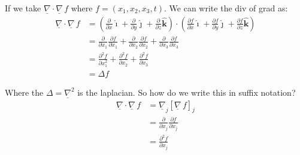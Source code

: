 \documentclass{article}
\newcommand{\veci}{\bm{\hat{\imath}}}
\newcommand{\vecj}{\bm{\hat{\jmath}}}
\newcommand{\veck}{\bm{\hat{k}}}
\newcommand{\nab}{\underline{\nabla}}
\newcommand{\grad}{{\nab}\, f}
\newcommand{\pd}[2]{\frac{\partial #1}{\partial #2}}
\renewcommand{\div}[1]{\nab \cdot #1}
\begin{document}
If we take $\nab \cdot \grad$ where $f = (x_1, x_2, x_3, t)$. We can write the div of grad as:
\begin{align*}
  \div \grad &= \left(\pd{}{x}\veci + \pd{}{y}\vecj + \pd{}{z}\veck \right) \cdot \left(\pd{f}{x}\veci + \pd{f}{y}\vecj + \pd{f}{z}\veck \right) \\
  &= \pd{}{x_1}\pd{f}{x_1} + \pd{}{x_2}\pd{f}{x_2} + \pd{}{x_3}\pd{f}{x_3}\\
  &= \pd{^2 f}{x_1^2} + \pd{^2 f}{x_2} + \pd{^2 f}{x_3}\\
  &= \Delta f
\end{align*}

Where the $\Delta = \nab ^2$ is the laplacian. So how do we write this in suffix notation?
\begin{align*}
  \div \grad &= \nab_j[\grad]_j\\
  &= \pd{}{x_j} \pd{f}{x_j}\\
  &= \pd{^2 f}{x_j}\\
\end{align*}
\end{document}
